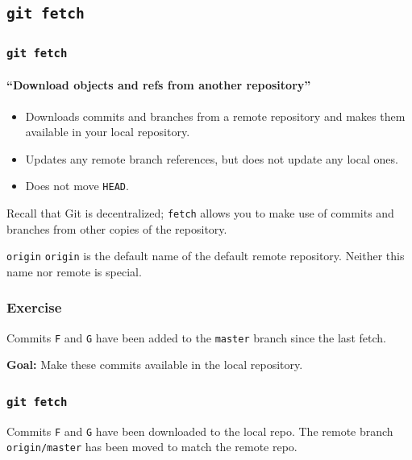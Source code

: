 \documentclass{beamer}
\newcommand\gitcmd[1]{\texttt{git #1}}
\newcommand\gitsubcmd[1]{\texttt{#1}}
\newcommand\grefspec[1]{\texttt{#1}}
\newcommand\gbranch[1]{\texttt{#1}}
\newcommand\gremotebranch[1]{\texttt{#1}}
\newcommand\gHEAD{\texttt{HEAD}}
\newcommand\gremote[1]{\texttt{#1}}
\newcommand\goal[1]{\textbf{Goal:} #1}
\begin{document}
\subsection{\gitcmd{fetch}}

\begin{frame}
  \frametitle{\gitcmd{fetch}}
  \framesubtitle{``Download objects and refs from another repository''}
  \begin{itemize}
    \item Downloads commits and branches from a remote repository and makes them available in your local repository.
    \item Updates any remote branch references, but does not update any local ones.
    \item Does not move \gHEAD{}.
  \end{itemize}
  Recall that Git is decentralized; \gitsubcmd{fetch} allows you to make use of commits and branches from other copies of the repository.
  \vfill
  \begin{block}{\gremote{origin}}
    \gremote{origin} is the default name of the default remote repository. Neither this name nor remote is special.
  \end{block}
\end{frame}

\begin{frame}
  \frametitle{Exercise}

  Commits \grefspec{F} and \grefspec{G} have been added to the \gbranch{master} branch since the last fetch.

  \goal{Make these commits available in the local repository.}

  \begin{figure}
    \centering
  \end{figure}
\end{frame}

\begin{frame}
  \frametitle{\gitcmd{fetch}}

  \begin{figure}
    \centering
  \end{figure}

  Commits \grefspec{F} and \grefspec{G} have been downloaded to the local repo. The remote branch \gremotebranch{origin/master} has been moved to match the remote repo.
\end{frame}
\end{document}
